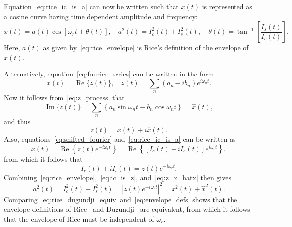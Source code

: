\documentclass[12pt]{article}
\theoremstyle{plain}
\theoremstyle{definition}
\theoremstyle{remark}
\begin{document}
Equation~\eqref{eq:rice_ic_is_a} can now be written such that $x(t)$ is represented as a cosine curve having time dependent amplitude and frequency:
\begin{equation}
    x(t) = a(t) \cos [\omega_r t + \theta(t)], \quad a^2(t) = I_c^2(t) + I_s^2(t), \quad \theta(t) = \tan^{-1} \left[ \frac{I_s(t)}{I_c(t)} \right].
    \label{eq:rice_envelope}
\end{equation}
Here, $a(t)$ as given by~\eqref{eq:rice_envelope} is Rice's definition of the envelope of $x(t)$. 

Alternatively, equation~\eqref{eq:fourier_series} can be written in the form
\begin{equation}
    x(t) = \operatorname{Re}\{z(t)\}, \quad z(t) = \sum_n (a_n - i b_n) e^{i \omega_n t}.
    \label{eq:z_process}
\end{equation}
Now it follows from~\eqref{eq:z_process} that
\begin{equation}
    \operatorname{Im}\{z(t)\} = \sum_n \left\{ a_n \sin \omega_n t - b_n \cos \omega_n t \right\} = \hat{x}(t),
    \label{eq:im_z}
\end{equation}
and thus
\begin{equation}
    z(t) = x(t) + i \hat{x}(t).
    \label{eq:z_x_hatx}
\end{equation}
Also, equations~\eqref{eq:shifted_fourier} and~\eqref{eq:rice_ic_is_a} can be written as
\begin{equation}
    x(t) = \operatorname{Re} \left\{ z(t) e^{-i \omega_r t} \right\} = \operatorname{Re} \left\{ [I_c(t) + i I_s(t)] e^{i \omega_r t} \right\},
    \label{eq:rice_rewrite}
\end{equation}
from which it follows that
\begin{equation}
    I_c(t) + i I_s(t) = z(t) e^{-i \omega_r t}.
    \label{eq:ic_is_z}
\end{equation}
Combining~\eqref{eq:rice_envelope},~\eqref{eq:ic_is_z}, and~\eqref{eq:z_x_hatx} then gives
\begin{equation}
    a^2(t) = I_c^2(t) + I_s^2(t) = |z(t) e^{-i \omega_r t}|^2 = x^2(t) + \hat{x}^2(t).
    \label{eq:rice_dugundji_equiv}
\end{equation}
Comparing~\eqref{eq:rice_dugundji_equiv} and~\eqref{eq:envelope_defs} shows that the envelope definitions of Rice~\cite{rice1954} and Dugundji~\cite{dugundji1958} are equivalent, from which it follows that the envelope of Rice must be independent of $\omega_r$.
\end{document}
